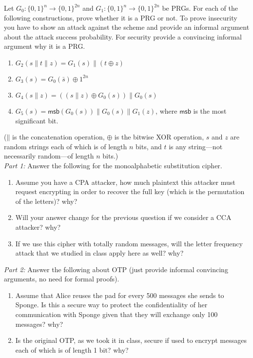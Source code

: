\documentclass[12pt]{article}
\newcommand{\zo}{\{0,1\}}
\newcommand*\concat{\mathbin{\|}}
\newcommand\xor{\oplus}
\begin{document}
Let $G_0:\zo^n \to \zo^{2n}$ and $G_1:\zo^n \to \zo^{2n}$ be PRGs. For each of the following constructions, prove whether it is a PRG or not. To prove insecurity you have to show an attack against the scheme and provide an informal argument about the attack success probability. For security provide a convincing informal argument why it is a PRG.
\begin{enumerate}
\item $G_2(s \concat t \concat z)= G_1(s) \concat (t \xor z)$ 

\item $G_3(s)= G_0(\bar{s}) \oplus 1^{2n}$

\item $G_4(s \concat z) =  ((s \concat z) \oplus G_0(s)) \concat G_0(s)$

\item $G_5(s) = \mathsf{msb}(G_0(s)) \concat G_0(s) \concat G_1(z)$, where $\mathsf{msb}$ is the most significant bit.
\end{enumerate} 
($\concat$ is the concatenation operation, $\oplus$ is the bitwise XOR operation, $s$ and $z$ are random strings each of which is of length $n$ bits, and $t$ is any string---not necessarily random---of length $n$ bits.)\\


\newpage
{}
\noindent\emph{Part 1:} Answer the following for the monoalphabetic substitution cipher.
\begin{enumerate}
\item Assume you have a CPA attacker, how much plaintext this attacker must request encrypting in order to recover the full key (which is the permutation of the letters)? why? 

\item Will your answer change for the previous question if we consider  a CCA attacker? why?

\item If we use this cipher with totally random messages, will the letter frequency attack that we studied in class apply here as well? why?
\end{enumerate}


\noindent\emph{Part 2:} Answer the following about OTP (just provide informal convincing arguments, no need for formal proofs).
\begin{enumerate}
\item Assume that Alice reuses the pad for every 500 messages she sends to Sponge. Is this a secure way to protect the confidentiality of her communication with Sponge given that they will exchange only 100 messages? why?

\item Is the original OTP, as we took it in class, secure if used to encrypt messages each of which is of length 1 bit? why?
\end{enumerate}


\end{document}
